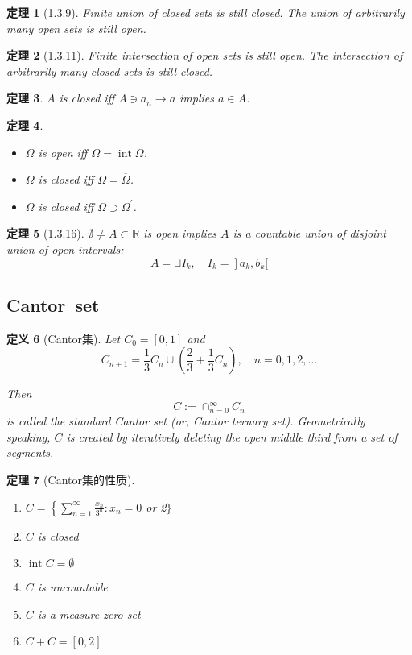 \documentclass[10pt,openany]{book}
\theoremstyle{thmstyle} %
\newtheorem{theorem}{定理}[chapter]
\theoremstyle{defstyle} %
\newtheorem{definition}[theorem]{定义}
\theoremstyle{prostyle} %
\begin{document}
\begin{theorem}[1.3.9] 
Finite union of closed sets is still closed.
The union of arbitrarily many open sets is still open.
\end{theorem}

\begin{theorem}[1.3.11] 
Finite intersection of open sets is still open.
The intersection of arbitrarily many closed sets is still closed.
\end{theorem}

\begin{theorem} 
$A$ is closed iff $A \ni a_n \rightarrow a$ implies $a \in A$.
\end{theorem}


\begin{theorem} \

\begin{itemize}
    \item $\Omega$ is open iff $\Omega=\operatorname{int} \Omega$.
    \item $\Omega$ is closed iff $\Omega=\overline{\Omega}$.
    \item $\Omega$ is closed iff $\Omega \supset \Omega^\prime$.
\end{itemize}
\end{theorem}

\begin{theorem}[1.3.16]
$\emptyset \neq A \subset \mathbb{R}$ is open implies $A$ is a countable union of disjoint union of open intervals:
$$
\left.A=\sqcup I_k, \quad I_k=\right] a_k, b_k[
$$
\end{theorem}




\subsection{Cantor~set}


\begin{definition}[Cantor集]
Let $C_0=[0,1]$ and
$$
C_{n+1}=\frac{1}{3} C_n \cup\left(\frac{2}{3}+\frac{1}{3} C_n\right), \quad n=0,1,2, \ldots
$$

Then
$$
C:=\cap_{n=0}^{\infty} C_n
$$
is called the standard Cantor set (or, Cantor ternary set).
Geometrically speaking, $C$ is created by iteratively deleting the open middle third from a set of segments.
\end{definition}

\begin{theorem}[Cantor集的性质] \

\begin{enumerate}[1)]
    \item $C=\left\{\sum_{n=1}^{\infty} \frac{x_n}{3^n}: x_n=0\right.$ or 2$\}$
    \item $C$ is closed
    \item $\operatorname{int} C=\emptyset$
    \item $C$ is uncountable
    \item $C$ is a measure zero set
    \item $C+C=[0,2]$
\end{enumerate}
\end{theorem}
\end{document}
